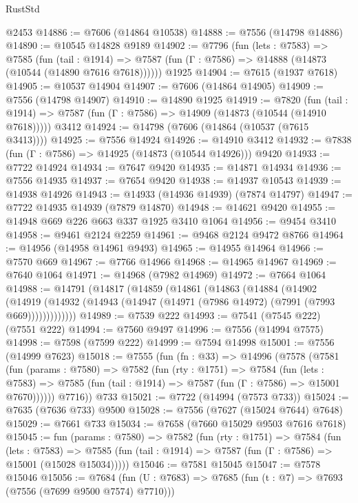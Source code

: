 \begin{lexlean}{RustStd}
\begin{coremodule}
{\begin{coremodule}
{{{{{{{{{{{{{{{{{{{{{{{{{{{{{{{{{{{{{{{{{{{    @2453
@14886 := @7606 (@14864 @10538)
@14888 := @7556 (@14798 @14886)
@14890 := @10545 @14828 @9189
@14902 := @7796
    (fun (lets : @7583) =>
    @7585
      (fun (tail : @1914) =>
      @7587 (fun (Γ : @7586) => @14888 (@14873 (@10544 (@14890 @7616 @7618))))))
    @1925
@14904 := @7615 (@1937 @7618)
@14905 := @10537 @14904
@14907 := @7606 (@14864 @14905)
@14909 := @7556 (@14798 @14907)
@14910 := @14890 @1925
@14919 := @7820
    (fun (tail : @1914) => @7587 (fun (Γ : @7586) => @14909 (@14873 (@10544 (@14910 @7618)))))
    @3412
@14924 := @14798 (@7606 (@14864 (@10537 (@7615 @3413))))
@14925 := @7556 @14924
@14926 := @14910 @3412
@14932 := @7838 (fun (Γ : @7586) => @14925 (@14873 (@10544 @14926))) @9420
@14933 := @7722 @14924
@14934 := @7647 @9420
@14935 := @14871 @14934
@14936 := @7556 @14935
@14937 := @7654 @9420
@14938 := @14937 @10543
@14939 := @14938 @14926
@14943 := @14933 (@14936 @14939) (@7874 @14797)
@14947 := @7722 @14935 @14939 (@7879 @14870)
@14948 := @14621 @9420
@14955 := @14948 @669 @226 @663 @337 @1925 @3410 @1064
@14956 := @9454 @3410
@14958 := @9461 @2124 @2259
@14961 := @9468 @2124 @9472 @8766
@14964 := @14956 (@14958 @14961 @9493)
@14965 := @14955 @14964
@14966 := @7570 @669
@14967 := @7766 @14966
@14968 := @14965 @14967
@14969 := @7640 @1064
@14971 := @14968 (@7982 @14969)
@14972 := @7664 @1064
@14988 := @14791
    (@14817
      (@14859
        (@14861
          (@14863
            (@14884
              (@14902
                (@14919
                  (@14932 (@14943 (@14947 (@14971 (@7986 @14972) (@7991 (@7993 @669)))))))))))))
@14989 := @7539 @222
@14993 := @7541 (@7545 @222) (@7551 @222)
@14994 := @7560 @9497
@14996 := @7556 (@14994 @7575)
@14998 := @7598 (@7599 @222)
@14999 := @7594 @14998
@15001 := @7556 (@14999 @7623)
@15018 := @7555
    (fun (fn : @33) =>
    @14996
      (@7578
        (@7581
          (fun (params : @7580) =>
          @7582
            (fun (rty : @1751) =>
            @7584
              (fun (lets : @7583) =>
              @7585 (fun (tail : @1914) => @7587 (fun (Γ : @7586) => @15001 @7670))))))
        @7716))
    @733
@15021 := @7722 (@14994 (@7573 @733))
@15024 := @7635 (@7636 @733) @9500
@15028 := @7556 (@7627 (@15024 @7644) @7648)
@15029 := @7661 @733
@15034 := @7658 (@7660 @15029 @9503 @7616 @7618)
@15045 := fun (params : @7580) =>
  @7582
    (fun (rty : @1751) =>
    @7584
      (fun (lets : @7583) =>
      @7585 (fun (tail : @1914) => @7587 (fun (Γ : @7586) => @15001 (@15028 @15034)))))
@15046 := @7581 @15045
@15047 := @7578 @15046
@15056 := @7684 (fun (U : @7683) => @7685 (fun (t : @7) => @7693 (@7556 (@7699 @9500 @7574) @7710)))
}}}}}}}}}}}}}}}}}}}}}}}}}}}}}}}}}}}}}}}}}}}
\end{coremodule}}
\end{coremodule}
\end{lexlean}

